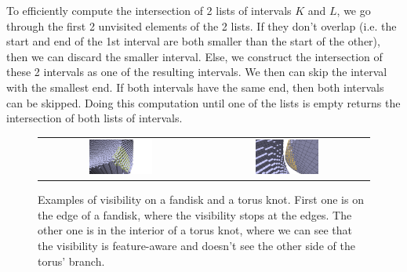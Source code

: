 \documentclass[runningheads]{llncs}
\begin{document}
    To efficiently compute the intersection of 2 lists of intervals $K$ and $L$, we go through the first 2 unvisited
    elements of the 2 lists. If they don't overlap (i.e. the start and end of the 1st interval are both smaller than
    the start of the other), then we can discard the smaller interval. Else, we construct the intersection of these
    2 intervals as one of the resulting intervals. We then can skip the interval with the smallest end. If both
    intervals have the same end, then both intervals can be skipped. Doing this computation until one of the lists
    is empty returns the intersection of both lists of intervals.


    \begin{figure}
        \centering
        \begin{tabular}{c c}
            \includegraphics[width=0.4\textwidth]{pictures/visibility_from_given_point_r_10} &
            \includegraphics[width=0.4\textwidth]{pictures/visibility_aware_of_features}
        \end{tabular}
        \caption{Examples of visibility on a fandisk and a torus knot. First one is on the edge
        of a fandisk, where the visibility stops at the edges. The other one is in the interior
        of a torus knot, where we can see that the visibility is feature-aware and doesn't see
        the other side of the torus' branch.}
        \label{fig:visibility-results}
    \end{figure}
%
\end{document}
